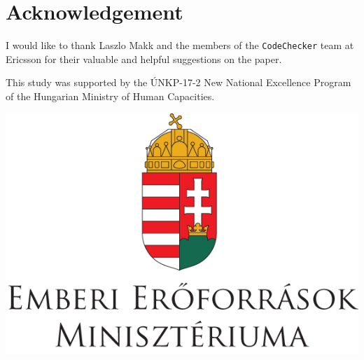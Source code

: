 \section{Acknowledgement}
I would like to thank Laszlo Makk and the members of the \texttt{CodeChecker} 
team at Ericsson for their valuable and helpful suggestions on the paper. 

This study was supported by the \'UNKP-17-2 New National Excellence Program of 
the Hungarian Ministry of Human Capacities.
\begin{center}
	\includegraphics[scale=0.2]{img/unkp}\\
\end{center}